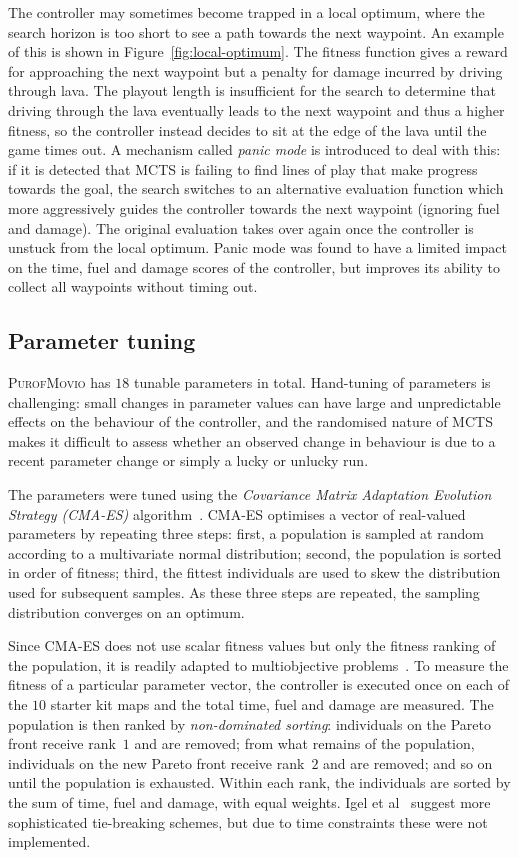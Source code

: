 \documentclass[conference]{IEEEtran}
\begin{document}
The controller may sometimes become trapped in a local optimum,
where the search horizon is too short to see a path towards the next waypoint.
An example of this is shown in Figure~\ref{fig:local-optimum}.
The fitness function gives a reward for approaching the next waypoint but a penalty for damage incurred by driving through lava.
The playout length is insufficient for the search to determine that driving through the lava eventually leads to the next waypoint and thus a higher fitness,
so the controller instead decides to sit at the edge of the lava until the game times out.
A mechanism called \emph{panic mode} is introduced to deal with this:
if it is detected that MCTS is failing to find lines of play that make progress towards the goal,
the search switches to an alternative evaluation function which more aggressively guides the controller towards the next waypoint (ignoring fuel and damage).
The original evaluation takes over again once the controller is unstuck from the local optimum.
Panic mode was found to have a limited impact on the time, fuel and damage scores of the controller,
but improves its ability to collect all waypoints without timing out.

\subsection{Parameter tuning}

\textsc{PurofMovio} has $18$ tunable parameters in total.
Hand-tuning of parameters is challenging:
small changes in parameter values can have large and unpredictable effects on the behaviour of the controller,
and the randomised nature of MCTS makes it difficult to assess whether an observed change in behaviour is due to a recent parameter change
or simply a lucky or unlucky run.

The parameters were tuned using the \emph{Covariance Matrix Adaptation Evolution Strategy (CMA-ES)} algorithm~\cite{Hansen2001}.
CMA-ES optimises a vector of real-valued parameters by repeating three steps:
first, a population is sampled at random according to a multivariate normal distribution;
second, the population is sorted in order of fitness;
third, the fittest individuals are used to skew the distribution used for subsequent samples.
As these three steps are repeated, the sampling distribution converges on an optimum.

Since CMA-ES does not use scalar fitness values but only the fitness ranking of the population,
it is readily adapted to multiobjective problems~\cite{Igel2007}.
To measure the fitness of a particular parameter vector,
the controller is executed once on each of the $10$ starter kit maps and the total time, fuel and damage are measured.
The population is then ranked by \emph{non-dominated sorting}:
individuals on the Pareto front receive rank~$1$ and are removed;
from what remains of the population, individuals on the new Pareto front receive rank~$2$ and are removed;
and so on until the population is exhausted.
Within each rank, the individuals are sorted by the sum of time, fuel and damage, with equal weights.
Igel et al~\cite{Igel2007} suggest more sophisticated tie-breaking schemes, but due to time constraints these were not implemented.
\end{document}
